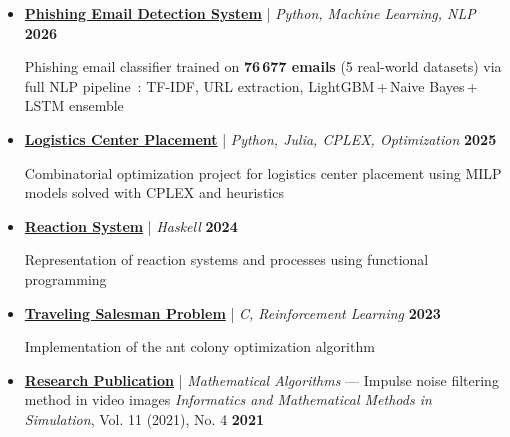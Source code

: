 \documentclass[10pt,english,french]{article}
\begin{document}
\vspace{-5pt}
\begin{itemize}[leftmargin=0.5cm, label=\textbullet, itemsep=0.2em]
    \item \href{https://github.com/DmytroPalahin/phishing-email-detection}{\textbf{Phishing Email Detection System}} | \textit{Python, Machine Learning, NLP} \hfill \textbf{2026}

          Phishing email classifier trained on \textbf{76\,677 emails} (5 real-world datasets) via
          full NLP pipeline~: TF-IDF, URL extraction, LightGBM\,+\,Naive Bayes\,+\,LSTM ensemble

    \item \href{https://github.com/DmytroPalahin/logistics-center-placement}{\textbf{Logistics Center Placement}} | \textit{Python, Julia, CPLEX, Optimization} \hfill \textbf{2025}

          Combinatorial optimization project for logistics center placement using MILP
          models solved with CPLEX and heuristics

    \item \href{https://github.com/DmytroPalahin/hsReact}{\textbf{Reaction System}} | \textit{Haskell} \hfill \textbf{2024}

          Representation of reaction systems and processes using functional programming

    \item \href{https://github.com/DmytroPalahin/Probleme_du_Voyageur_de_Commerce}{\textbf{Traveling Salesman Problem}} | \textit{C, Reinforcement Learning} \hfill \textbf{2023}

          Implementation of the ant colony optimization algorithm

    \item \href{https://www.researchsquare.com/article/rs-2203260/v1}{\textbf{Research Publication}} | \textit{Mathematical Algorithms} --- Impulse noise filtering method in video images \textit{Informatics and Mathematical Methods in Simulation}, Vol. 11 (2021), No. 4 \hfill \textbf{2021}


\end{itemize}
\end{document}
